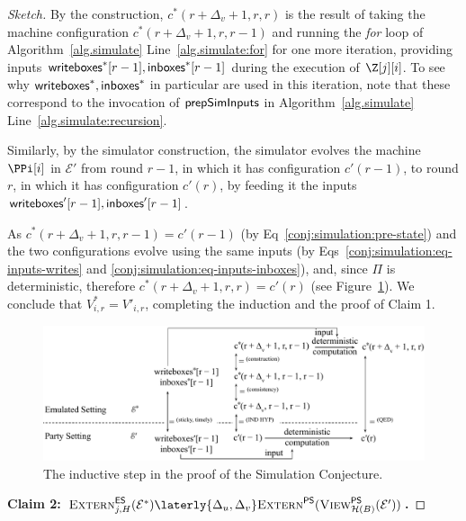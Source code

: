 \begin{proof}[Sketch]
  By the \rollerblade construction,
  $c^*(r + \Delta_v + 1, r, r)$ is the result of
  taking the machine configuration
  $c^*(r + \Delta_v + 1, r, r - 1)$
  and running the \emph{for} loop of Algorithm~\ref{alg.simulate} Line~\ref{alg.simulate:for}
  for one more iteration, providing inputs $\textsf{writeboxes}^*[r - 1], \textsf{inboxes}^*[r - 1]$
  during the execution of $\Z[j][i]$.
  To see why $\textsf{writeboxes}^*, \textsf{inboxes}^*$ in particular are used in this iteration,
  note that these correspond to the invocation of $\textsf{prepSimInputs}$ in
  Algorithm~\ref{alg.simulate} Line~\ref{alg.simulate:recursion}.

  Similarly, by the simulator construction, %
  the simulator evolves the machine $\PPi[i]$ in $\mathcal{E}'$ from round $r - 1$,
  in which it has configuration $c'(r - 1)$,
  to round $r$,
  in which it has configuration $c'(r)$,
  by feeding it the inputs $\textsf{writeboxes}'[r - 1], \textsf{inboxes}'[r - 1]$.

  As $c^*(r + \Delta_v + 1, r, r - 1) = c'(r - 1)$ (by Eq~\ref{conj:simulation:pre-state})
  and the two configurations evolve using the same inputs (by
  Eqs~\ref{conj:simulation:eq-inputs-writes} and \ref{conj:simulation:eq-inputs-inboxes}),
  and, since $\Pi$ is deterministic,
  therefore $c^*(r + \Delta_v + 1, r, r) = c'(r)$ (see Figure~\ref{fig.emulation-claim-1-induction}).
  We conclude that $V^*_{i,r} = V'_{i,r}$, completing the induction
  and the proof of Claim 1.

  \begin{figure}
    \centering
    \includegraphics[width=\textwidth,keepaspectratio]{figures/emulation-claim-1-induction.pdf}
    \caption{The inductive step in the proof of the Simulation Conjecture.}
    \label{fig.emulation-claim-1-induction}
  \end{figure}


  \noindent
  \textbf{Claim 2: $\LCExtern_{j,H}(\mathcal{E}^*) \laterly{\Delta_u,\Delta_v} \PEExtern(\PEView_{\mathcal{H}(B)}(\mathcal{E}'))$.}


\end{proof}
